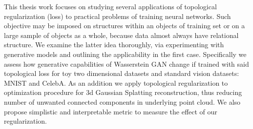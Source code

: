 This thesis work focuses on studying several applications of topological regularization (loss) to practical problems of training neural networks. Such objective may be imposed on structures within an objects of training set or on a large sample of objects as a whole, because data almost always have relational structure. We examine the latter idea thoroughly, via experimenting with generative models and outlining the applicability in the first case. Specifically we assess how generative capabilities of Wasserstein GAN change if trained with said topological loss for toy two dimensional datasets and standard vision datasets: MNIST and CelebA. As an addition we apply topological regularization to optimization procedure for 3d Gaussian Splatting reconstruction, thus reducing number of unwanted connected components in underlying point cloud. We also propose simplistic and interpretable metric to measure the effect of our regularization.
